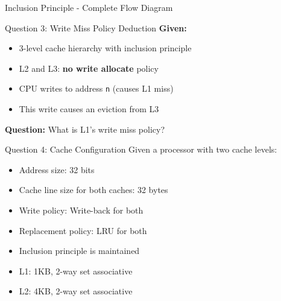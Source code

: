 \documentclass[aspectratio=169,12pt]{beamer}
\begin{document}
\begin{frame}{Inclusion Principle - Complete Flow Diagram}
\end{frame}

\begin{frame}{Question 3: Write Miss Policy Deduction}
\textbf{Given:}
\begin{itemize}
    \item 3-level cache hierarchy with inclusion principle
    \item L2 and L3: \textbf{no write allocate} policy
    \item CPU writes to address \texttt{n} (causes L1 miss)
    \item This write causes an eviction from L3
\end{itemize}

\vspace{0.4cm}
\textbf{Question:} What is L1's write miss policy?

\vspace{0.4cm}
\end{frame}

\begin{frame}{Question 4: Cache Configuration}
Given a processor with two cache levels:
\begin{itemize}
    \item Address size: 32 bits
    \item Cache line size for both caches: 32 bytes
    \item Write policy: Write-back for both
    \item Replacement policy: LRU for both
    \item Inclusion principle is maintained
    \item L1: 1KB, 2-way set associative
    \item L2: 4KB, 2-way set associative
\end{itemize}
\end{frame}
\end{document}
